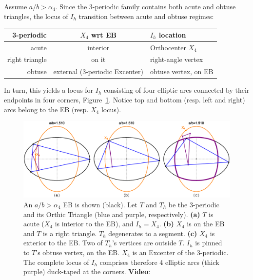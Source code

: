 Assume $a/b>\alpha_4$. Since the 3-periodic family contains both acute and obtuse triangles, the locus of $I_h$ transition between acute and obtuse regimes:

\begin{center}
\small
\begin{tabular}{r|c|l}
 3-periodic & $X_4$ wrt EB & $I_h$ location \\ 
 \hline
 acute & interior & Orthocenter $X_4$ \\  
 right triangle & on it & right-angle vertex \\
obtuse & external (3-periodic Excenter) & obtuse vertex, on EB 
\end{tabular}

\end{center}

In turn, this yields a locus for $I_h$ consisting of four elliptic arcs connected by their endpoints in four corners, Figure~\ref{fig:orthic_incenter_locus}. Notice top and bottom (resp. left and right) arcs belong to the EB (resp. $X_4$ locus).

\begin{figure}
    \centering
    \includegraphics[width=\textwidth]{pics/1030_ort_loci_kink.eps}
    \caption{An $a/b>\alpha_4$ EB is shown (black). Let $T$ and $T_h$ be the 3-periodic and its Orthic Triangle (blue and purple, respectively). \textbf{(a)} $T$ is acute ($X_4$ is interior to the EB), and $I_h=X_4$. \textbf{(b)} $X_4$ is on the EB and $T$ is a right triangle. $T_h$ degenerates to a segment. \textbf{(c)} $X_4$ is exterior to the EB. Two of $T_h$'s vertices are outside $T$. $I_h$ is pinned to $T$'s obtuse vertex, on the EB. $X_4$ is an Excenter of the 3-periodic. The complete locus of $I_h$ comprises therefore 4 elliptic arcs (thick purple) duck-taped at the corners. \textbf{Video}: \cite[PL\#07]{reznik2020-playlist-intriguing}}
    \label{fig:orthic_incenter_locus}
\end{figure}

